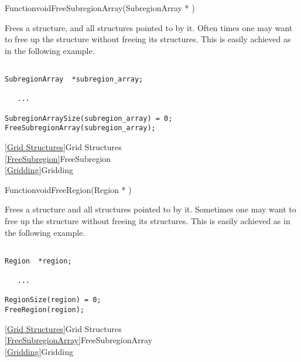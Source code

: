 {\newpage\clearpage
{}%
\begin{deftypefn}{Function}{void}{FreeSubregionArray}({SubregionArray *} )
\par
\DESCRIPTION
Frees a  structure, and all 
structures pointed to by it.
Often times one may want to free up the  structure
without freeing its  structures.
This is easily achieved as in the following example.
\par
\EXAMPLE
\mbox{}
\begin{display}\begin{verbatim}

SubregionArray  *subregion_array;

   ...

SubregionArraySize(subregion_array) = 0;
FreeSubregionArray(subregion_array);\end{verbatim}
\end{display}
\par
\SEEALSO
\vref{Grid Structures}{Grid Structures}\\
\vref{FreeSubregion}{FreeSubregion}\\
\vref{Gridding}{Gridding}
\par
\end{deftypefn}%
\lthtmlfigureZ
\lthtmlcheckvsize\clearpage}

{\newpage\clearpage
{}%
\begin{deftypefn}{Function}{void}{FreeRegion}({Region *} )
\par
\DESCRIPTION
Frees a  structure and all 
structures pointed to by it.
Sometimes one may want to free up the  structure
without freeing its  structures.
This is easily achieved as in the following example.
\par
\EXAMPLE
\mbox{}
\begin{display}\begin{verbatim}

Region  *region;

   ...

RegionSize(region) = 0;
FreeRegion(region);\end{verbatim}
\end{display}
\par
\SEEALSO
\vref{Grid Structures}{Grid Structures}\\
\vref{FreeSubregionArray}{FreeSubregionArray}\\
\vref{Gridding}{Gridding}
\par
\end{deftypefn}%
\lthtmlfigureZ
\lthtmlcheckvsize\clearpage}

